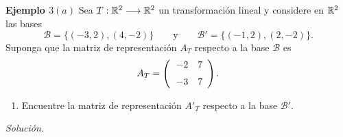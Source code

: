\subsection{}
%
\begin{frame}%

\begin{ej}{\textbf{Ejemplo $3(a)$ }}
	Sea $T:\mathbb{R}^2\longrightarrow\mathbb{R}^2$ un transformación lineal y considere en $\mathbb{R}^2$ las bases
	\[
	\mathcal{B}=\{(-3,2), (4,-2)\} \qquad \text{y} \qquad \mathcal{B}'=\{(-1,2), (2,-2)\}. 
 	\]
 	Suponga que la matriz de representación $A_T$ respecto a la base 
 	$\mathcal{B}$ es 
 	\[
 	A_T = 
 	\left( 
 	\begin{array}{@{\hspace{1\tabcolsep}}rr}	
 	-2 & 7 \\[2mm] 
 	-3 & 7
 	\end{array} 
 	\right).
 	\]
 	
 	\vspace{-2mm}
	\begin{enumerate}[$a$]
		\justifying
		\item Encuentre la matriz de representación ${A'}_T$ respecto a la base $\mathcal{B}'$.
	\end{enumerate}
\end{ej}
\textit{Solución.}

\end{frame}


